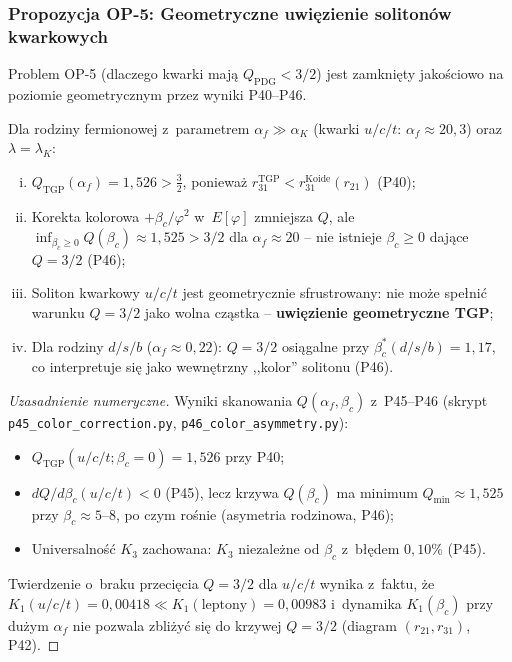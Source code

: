 \subsubsection{Propozycja OP-5: Geometryczne uwi\k{e}zienie soliton\'ow kwarkowych}%
\label{app:F-OP5-partial}

Problem OP-5 (dlaczego kwarki maj\k{a} $Q_{\mathrm{PDG}} < 3/2$) jest zamkni\k{e}ty
jako\'sciowo na poziomie geometrycznym przez wyniki P40--P46.

\begin{proposition}%
\label{prop:quark-confinement}
Dla rodziny fermionowej z~parametrem $\alpha_f \gg \alpha_K$ (kwarki $u/c/t$:
$\alpha_f \approx 20{,}3$) oraz $\lambda = \lambda_K$:
\begin{enumerate}[(i)]
  \item $Q_{\mathrm{TGP}}(\alpha_f) = 1{,}526 > \tfrac{3}{2}$, poniewa\.z
        $r_{31}^{\mathrm{TGP}} < r_{31}^{\mathrm{Koide}}(r_{21})$ (P40);
  \item Korekta kolorowa $+\beta_c/\varphi^2$ w~$E[\varphi]$ zmniejsza $Q$,
        ale $\inf_{\beta_c \geq 0} Q(\beta_c) \approx 1{,}525 > 3/2$
        dla $\alpha_f \approx 20$ -- nie istnieje $\beta_c \geq 0$
        daj\k{a}ce $Q=3/2$ (P46);
  \item Soliton kwarkowy $u/c/t$ jest geometrycznie sfrustrowany:
        nie mo\.ze spe\l{}ni\'c warunku $Q=3/2$ jako wolna cz\k{a}stka --
        \textbf{uwi\k{e}zienie geometryczne TGP};
  \item Dla rodziny $d/s/b$ ($\alpha_f \approx 0{,}22$): $Q=3/2$ osi\k{a}galne
        przy $\beta_c^*(d/s/b) = 1{,}17$, co interpretuje si\k{e} jako
        wewn\k{e}trzny ,,kolor'' solitonu (P46).
\end{enumerate}
\end{proposition}

\begin{proof}[Uzasadnienie numeryczne]
Wyniki skanowania $Q(\alpha_f, \beta_c)$ z~P45--P46 (skrypt
\texttt{p45\_color\_correction.py}, \texttt{p46\_color\_asymmetry.py}):
\begin{itemize}
  \item $Q_{\mathrm{TGP}}(u/c/t; \beta_c=0) = 1{,}526$ przy P40;
  \item $dQ/d\beta_c(u/c/t) < 0$ (P45), lecz krzywa $Q(\beta_c)$
        ma minimum $Q_{\min} \approx 1{,}525$ przy $\beta_c \approx 5$--$8$,
        po czym ro\'snie (asymetria rodzinowa, P46);
  \item Universalno\'s\'c $K_3$ zachowana: $K_3$ niezale\.zne od $\beta_c$
        z~b\l{}\k{e}dem $0{,}10\%$ (P45).
\end{itemize}
Twierdzenie o~braku przeci\k{e}cia $Q=3/2$ dla $u/c/t$ wynika z~faktu,
\.ze $K_1(u/c/t) = 0{,}00418 \ll K_1(\mathrm{leptony}) = 0{,}00983$
i~dynamika $K_1(\beta_c)$ przy du\.zym $\alpha_f$ nie pozwala zbli\.zy\'c
si\k{e} do krzywej $Q=3/2$ (diagram $(r_{21}, r_{31})$, P42).
\end{proof}

